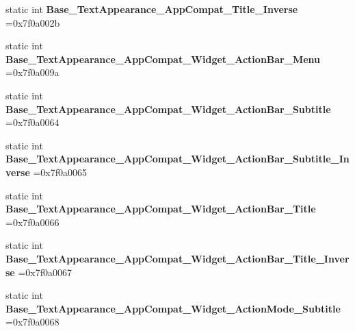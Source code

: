 \begin{DoxyCompactItemize}
static int {\bfseries Base\+\_\+\+Text\+Appearance\+\_\+\+App\+Compat\+\_\+\+Title\+\_\+\+Inverse} =0x7f0a002b
\item 
\mbox{\label{classandroid_1_1support_1_1graphics_1_1drawable_1_1animated_1_1R_1_1style_a7458ab851a639ca38bea7be0eb804943}} 
static int {\bfseries Base\+\_\+\+Text\+Appearance\+\_\+\+App\+Compat\+\_\+\+Widget\+\_\+\+Action\+Bar\+\_\+\+Menu} =0x7f0a009a
\item 
\mbox{\label{classandroid_1_1support_1_1graphics_1_1drawable_1_1animated_1_1R_1_1style_a4d2c28844e0fb03d6f1a16f9b4e09b9f}} 
static int {\bfseries Base\+\_\+\+Text\+Appearance\+\_\+\+App\+Compat\+\_\+\+Widget\+\_\+\+Action\+Bar\+\_\+\+Subtitle} =0x7f0a0064
\item 
\mbox{\label{classandroid_1_1support_1_1graphics_1_1drawable_1_1animated_1_1R_1_1style_aee52180bc0808b23f0630bfb6e5ad791}} 
static int {\bfseries Base\+\_\+\+Text\+Appearance\+\_\+\+App\+Compat\+\_\+\+Widget\+\_\+\+Action\+Bar\+\_\+\+Subtitle\+\_\+\+Inverse} =0x7f0a0065
\item 
\mbox{\label{classandroid_1_1support_1_1graphics_1_1drawable_1_1animated_1_1R_1_1style_a36edc358a80107f89a4babf2f6dea6ac}} 
static int {\bfseries Base\+\_\+\+Text\+Appearance\+\_\+\+App\+Compat\+\_\+\+Widget\+\_\+\+Action\+Bar\+\_\+\+Title} =0x7f0a0066
\item 
\mbox{\label{classandroid_1_1support_1_1graphics_1_1drawable_1_1animated_1_1R_1_1style_abc8080abf1039eea81a45773caec5181}} 
static int {\bfseries Base\+\_\+\+Text\+Appearance\+\_\+\+App\+Compat\+\_\+\+Widget\+\_\+\+Action\+Bar\+\_\+\+Title\+\_\+\+Inverse} =0x7f0a0067
\item 
\mbox{\label{classandroid_1_1support_1_1graphics_1_1drawable_1_1animated_1_1R_1_1style_a0223011f447fc86f53200c68d8812e1d}} 
static int {\bfseries Base\+\_\+\+Text\+Appearance\+\_\+\+App\+Compat\+\_\+\+Widget\+\_\+\+Action\+Mode\+\_\+\+Subtitle} =0x7f0a0068

\end{DoxyCompactItemize}
